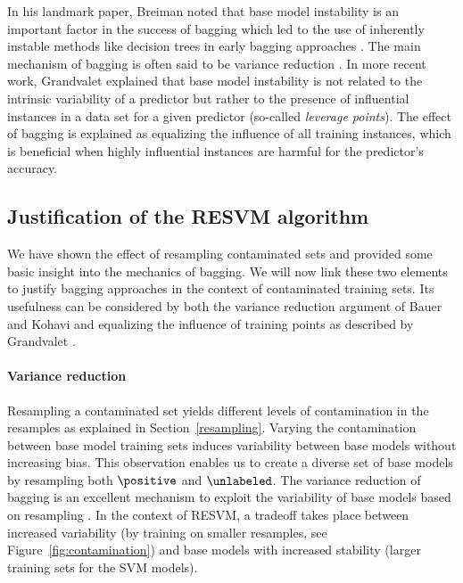 In his landmark paper, Breiman \citep{Breiman:1996:BP:231986.231989} noted that base model instability is an important factor in the success of bagging which led to the use of inherently instable methods like decision trees in early bagging approaches \citep{dietterich2000experimental, breiman2001random}. The main mechanism of bagging is often said to be variance reduction \citep{bauer1999empirical,breiman2000randomizing}. In more recent work, Grandvalet \citep{grandvalet2004bagging} explained that base model instability is not related to the intrinsic variability of a predictor but rather to the presence of influential instances in a data set for a given predictor (so-called \emph{leverage points}). The effect of bagging is explained as equalizing the influence of all training instances, which is beneficial when highly influential instances are harmful for the predictor's accuracy. 


\subsection{Justification of the RESVM algorithm}
We have shown the effect of resampling contaminated sets and provided some basic insight into the mechanics of bagging. We will now link these two elements to justify bagging approaches in the context of contaminated training sets. Its usefulness can be considered by both the variance reduction argument of Bauer and Kohavi \citep{bauer1999empirical} and equalizing the influence of training points as described by Grandvalet \citep{grandvalet2004bagging}.

\paragraph{Variance reduction} Resampling a contaminated set yields different levels of contamination in the resamples as explained in Section~\ref{resampling}. Varying the contamination between base model training sets induces variability between base models without increasing bias. This observation enables us to create a diverse set of base models by resampling both $\positive$ and $\unlabeled$. The variance reduction of bagging is an excellent mechanism to exploit the variability of base models based on resampling \citep{bauer1999empirical,breiman2000randomizing}. In the context of RESVM, a tradeoff takes place between increased variability (by training on smaller resamples, see Figure~\ref{fig:contamination}) and base models with increased stability (larger training sets for the SVM models).

